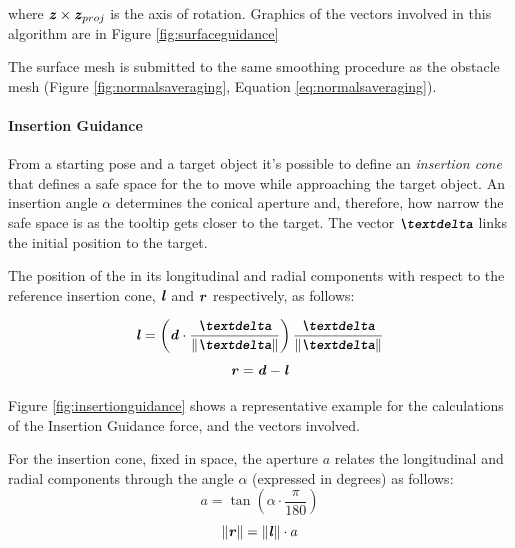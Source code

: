 \documentclass[../main.tex]{subfiles}
\begin{document}
where $\textbf{\textit{z}} \times \textbf{\textit{z}}_{proj}$ is the axis of rotation. Graphics of the vectors involved in this algorithm are in Figure \ref{fig:surfaceguidance}

The surface mesh is submitted to the same smoothing procedure as the obstacle mesh (Figure \ref{fig:normalsaveraging}, Equation \ref{eq:normalsaveraging}).

\paragraph{Insertion Guidance} From a starting pose and a target object it's possible to define an \textit{insertion cone} that defines a safe space for the \ee to move while approaching the target object. An insertion angle $\alpha$ determines the conical aperture and, therefore, how narrow the safe space is as the tooltip gets closer to the target. The vector $\vect{\textdelta}$ links the initial \psm position to the target. 

The position of the \ee in its longitudinal and radial components with respect to the reference insertion cone, $\textbf{\textit{l}}$ and $\textbf{\textit{r}}$ respectively, as follows:

\begin{equation}
    \vect{l} =  \left(\vect{d}\cdot \frac{\vect{\textdelta}}{\|\vect{\textdelta}\|} \right) \frac{\vect{\textdelta}}{\|\vect{\textdelta}\|}
\end{equation} 
\begin{equation}
    \textbf{\textit{r}} = \textbf{\textit{d}} - \textbf{\textit{l}}
\end{equation}

Figure \ref{fig:insertionguidance} shows a representative example for the calculations of the Insertion Guidance \vf force, and the vectors involved.

For the insertion cone, fixed in space, the aperture $a$ relates the longitudinal and radial components through the angle $\alpha$ (expressed in degrees) as follows:
\begin{equation}
    a = \tan\left(\alpha\cdot\frac{\pi}{180}\right)
\end{equation}
\begin{equation}
    \|\textbf{\textit{r}}\| = \|\textbf{\textit{l}}\|\cdot a
\end{equation}
\end{document}
